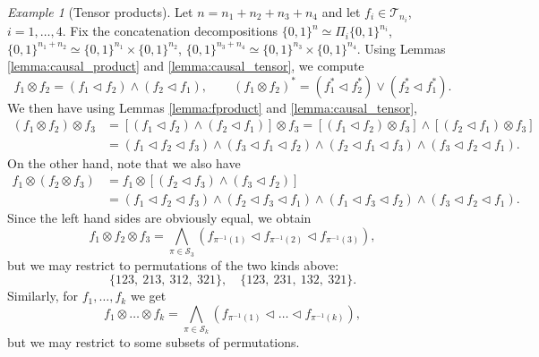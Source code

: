 \documentclass[12pt]{article}
\theoremstyle{definition}
\theoremstyle{remark}
\newtheorem{exm}{Example}
\def\Te{\mathcal T}
\def\permut{\mathscr{S}}
\def\vtl{\vartriangleleft}
\begin{document}
\begin{exm}[Tensor products] Let $n=n_1+n_2+n_3+n_4$ and let $f_i\in \Te_{n_i}$, $i=1,\dots,4$. 
Fix the concatenation decompositions $\{0,1\}^n\simeq \Pi_i\{0,1\}^{n_i}$,
$\{0,1\}^{n_1+n_2}\simeq \{0,1\}^{n_1}\times \{0,1\}^{n_2}$, $\{0,1\}^{n_3+n_4}\simeq
\{0,1\}^{n_3}\times \{0,1\}^{n_4}$. Using Lemmas \ref{lemma:causal_product} and \ref{lemma:causal_tensor}, we compute
\[
f_1\otimes f_2=(f_1\vtl f_2)\wedge (f_2\vtl f_1),\qquad 
(f_1\otimes f_2)^*=(f^*_1\vtl f^*_2)\vee (f^*_2\vtl f^*_1).
\]
We then have using Lemmas \ref{lemma:fproduct} and \ref{lemma:causal_tensor},
\begin{align*}
(f_1\otimes f_2)\otimes f_3&=[(f_1\vtl f_2)\wedge (f_2\vtl f_1)]\otimes f_3=
[(f_1\vtl f_2)\otimes f_3]\wedge [(f_2\vtl f_1)\otimes f_3]\\
&=(f_1\vtl f_2 \vtl f_3)\wedge (f_3\vtl f_1\vtl f_2)\wedge (f_2\vtl f_1\vtl f_3)\wedge
(f_3\vtl f_2\vtl f_1).
\end{align*}
On the other hand, note that we also have
\begin{align*}
f_1\otimes (f_2\otimes f_3)&=f_1\otimes [(f_2\vtl f_3)\wedge (f_3\vtl f_2)]\\
&= (f_1\vtl f_2\vtl f_3)\wedge (f_2\vtl f_3\vtl f_1)\wedge (f_1\vtl f_3\vtl f_2)\wedge
(f_3\vtl f_2\vtl f_1).
\end{align*}
Since the left hand sides are obviously equal, we obtain
\[
f_1\otimes f_2\otimes f_3=\bigwedge_{\pi\in \permut_3} (f_{\pi^{-1}(1)}\vtl
f_{\pi^{-1}(2)}\vtl f_{\pi^{-1}(3)}),
\]
but we may restrict to permutations of the two kinds above:
\[
\{123,\ 213,\ 312,\ 321\},\quad \{123,\ 231,\ 132,\ 321\}.
\]
Similarly, for $f_1,\dots, f_k$ we get 
\[
f_1\otimes \dots \otimes f_k=\bigwedge_{\pi\in \permut_k} (f_{\pi^{-1}(1)}\vtl
\dots \vtl f_{\pi^{-1}(k)}),
\]
but we may restrict to some subsets of permutations.


\end{exm}
\end{document}

